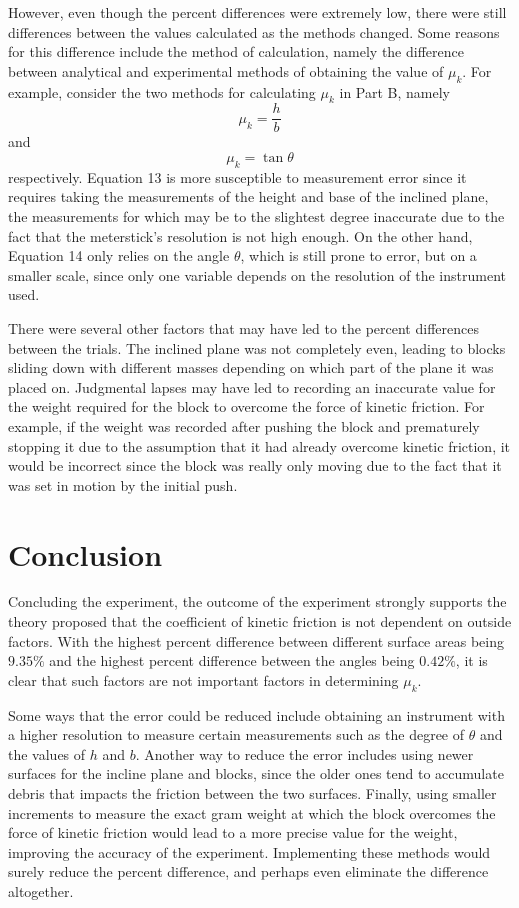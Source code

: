 \documentclass{article}
\theoremstyle{definition}
\begin{document}
However, even though the percent differences were extremely low, there were still differences between
the values calculated as the methods changed. Some reasons for this difference include the method
of calculation, namely the difference between analytical and experimental methods of obtaining the value of
$\mu_k$. For example, consider the two methods for calculating $\mu_k$ in Part B, namely
\begin{equation}
    \mu_k = \frac{h}{b}
\end{equation} 
and 
\begin{equation}
    \mu_k  = \tan\theta
\end{equation}
respectively. Equation 13 is more susceptible to measurement error since it requires taking the measurements
of the height and base of the inclined plane, the measurements for which may be to the slightest degree 
inaccurate due to the fact that the meterstick's resolution is not high enough. On the other hand, 
Equation 14 only relies on the angle $\theta$, which is still prone to error, but on a smaller scale, since only
one variable depends on the resolution of the instrument used.

There were several other factors that may have led to the percent differences between the trials. 
The inclined plane was not completely even, leading to blocks sliding down with different masses depending
on which part of the plane it was placed on. Judgmental lapses may have led to recording an inaccurate value 
for the weight required for the block to overcome the force of kinetic friction. For example, if the weight was recorded
after pushing the block and prematurely stopping it due to the assumption that it had already overcome kinetic friction, it would be incorrect since the
block was really only moving due to the fact that it was set in motion by the initial push.
\section{Conclusion}
Concluding the experiment, the outcome of the experiment strongly supports the theory proposed that the
coefficient of kinetic friction is not dependent on outside factors. With the highest percent difference between
different surface areas being $9.35\%$ and the highest percent difference between the angles being
$0.42\%$, it is clear that such factors are not important factors in determining $\mu_k$.

Some ways that the error could be reduced include obtaining an instrument with a higher resolution to measure certain
measurements such as the degree of $\theta$ and the values of $h$ and $b$. Another way to reduce the error includes 
using newer surfaces for the incline plane and blocks, since the older ones tend to accumulate debris that impacts the 
friction between the two surfaces. Finally, using smaller increments to measure the exact gram weight at which the block 
overcomes the force of kinetic friction would lead to a more precise value for the weight, improving the accuracy of the 
experiment. Implementing these methods would surely reduce the percent difference, and perhaps even eliminate the
difference altogether.
\end{document}

